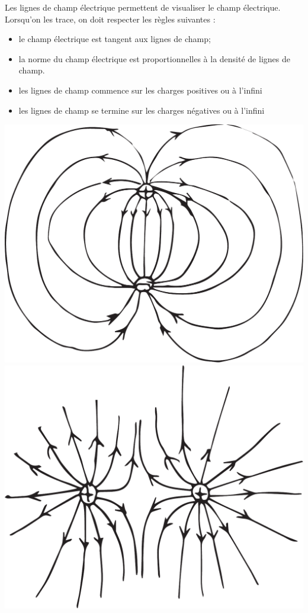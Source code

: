   Les lignes de champ électrique permettent de visualiser le champ électrique.
  Lorsqu'on les trace, on doit respecter les règles suivantes :

  \begin{itemize}
    \item le champ électrique est tangent aux lignes de champ;
    \item la norme du champ électrique est proportionnelles à la densité de
      lignes de champ.
    \item les lignes de champ commence sur les charges positives ou à l'infini
    \item les lignes de champ se termine sur les charges négatives ou à
      l'infini
  \end{itemize}

  \begin{center}
      \includegraphics[scale=0.3]{figures/lignes-champ-dipole.pdf}
      \includegraphics[scale=0.3]{figures/lignes-champ-deux-plus.pdf}
  \end{center}

